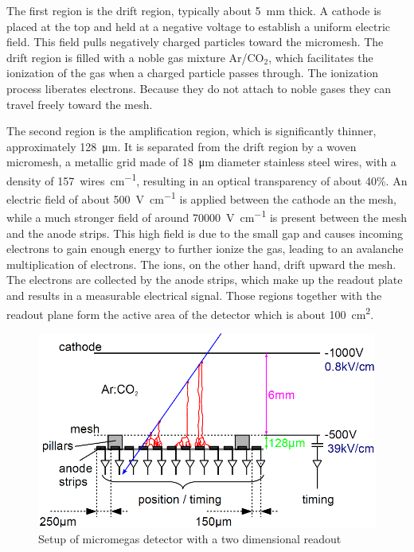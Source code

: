 \documentclass[sn-mathphys-num,iicol]{sn-jnl}
\theoremstyle{thmstyleone}
\theoremstyle{thmstyletwo}
\theoremstyle{thmstylethree}
\begin{document}
The first region is the drift region, typically about \SI{5}{\milli\meter} thick.
A cathode is placed at the top and held at a negative voltage to establish a uniform electric field.
This field pulls negatively charged particles toward the micromesh. 
The drift region is filled with a noble gas mixture Ar/CO$_2$, which facilitates the ionization of the gas when a charged particle passes through. 
The ionization process liberates electrons. 
Because they do not attach to noble gases they can travel freely toward the mesh. 

The second region is the amplification region, which is significantly thinner, approximately \SI{128}{\micro\meter}. 
It is separated from the drift region by a woven micromesh, a metallic grid made of \SI{18}{\micro\meter} diameter stainless steel wires, with a density of \SI{157}{wires\per\cm}, resulting in an optical transparency of about 40\%.
An electric field of about \SI{500}{\volt\per\centi\meter} is applied between the cathode an the mesh, while a much stronger field of around \SI{70000}{\volt\per\centi\meter} is present between the mesh and the anode strips. 
This high field is due to the small gap and causes incoming electrons to gain enough energy to further ionize the gas, leading to an avalanche multiplication of electrons. 
The ions, on the other hand, drift upward the mesh. 
The electrons are collected by the anode strips, which make up the readout plate and results in a measurable electrical signal. 
Those regions together with the readout plane form the active area of the detector which is about \SI{100}{\centi\meter^2}.
\begin{figure}
  \includegraphics[width=\linewidth]{figures/detector_readout.png}
  \caption{Setup of micromegas detector with a two dimensional readout}
  \label{fig:readout}
\end{figure}
\end{document}
